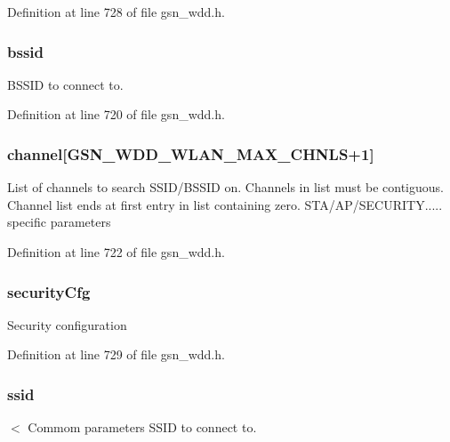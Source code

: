 Definition at line 728 of file gsn\_\-wdd.h.

\hypertarget{a00302_a1d70c2c8895c2763bdede85266c38318}{
\subsubsection[{bssid}]{ {\bf bssid}}}
\label{a00302_a1d70c2c8895c2763bdede85266c38318}
BSSID to connect to. 

Definition at line 720 of file gsn\_\-wdd.h.

\hypertarget{a00302_ad3776fa16ca5b00d270cd6365ac42a6f}{
\subsubsection[{channel}]{ {\bf channel}\mbox{[}GSN\_\-WDD\_\-WLAN\_\-MAX\_\-CHNLS+1\mbox{]}}}
\label{a00302_ad3776fa16ca5b00d270cd6365ac42a6f}
List of channels to search SSID/BSSID on. Channels in list must be contiguous. Channel list ends at first entry in list containing zero. STA/AP/SECURITY..... specific parameters 

Definition at line 722 of file gsn\_\-wdd.h.

\hypertarget{a00302_a1d473196c90a81dd38d88c8cf69b32bf}{
\subsubsection[{securityCfg}]{ {\bf securityCfg}}}
\label{a00302_a1d473196c90a81dd38d88c8cf69b32bf}
Security configuration 

Definition at line 729 of file gsn\_\-wdd.h.

\hypertarget{a00302_a9bcb2e5a0dbdd5461faec24950cf7459}{
\subsubsection[{ssid}]{ {\bf ssid}}}
\label{a00302_a9bcb2e5a0dbdd5461faec24950cf7459}
$<$ Commom parameters SSID to connect to. 

